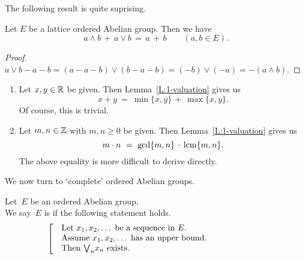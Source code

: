 \noindent
The following result is quite suprising.
%
%
\begin{lem}
\label{L:1-valuation}
Let $E$ be a lattice ordered Abelian group.
Then we have 
\begin{equation*}
a\wedge b  \,+\, a\vee b \,=\, a\,+\,b \qquad(a,b\in E).
\end{equation*}
\end{lem}
\begin{proof}
$a\vee b - a - b
= (a - a - b) \vee (b - a - b)
= (-b)\vee(-a) = -(a\wedge b)$.
\end{proof}
\begin{exs}
\begin{enumerate}
\item
Let $x,y\in \mathbb{R}$ be given.
Then Lemma~\ref{L:1-valuation}
gives us
\begin{equation*}
x+y\ =\ \min\{x,y\} \,+\, \max\{x,y\}.
\end{equation*}
Of course, this is trivial.

\item
Let $m,n\in \mathbb{Z}$ with $m,n\geq 0$ be given.
Then Lemma~\ref{L:1-valuation}
gives us
\begin{equation*}
m\cdot n \ =\ \gcd\{m,n\} \,\cdot\,\operatorname{lcm}\{m,n\}.
\end{equation*}
The above equality is more difficult to derive directly.
\end{enumerate}
\end{exs}
%
%
\noindent
We now turn to `complete' ordered Abelian groups.
\begin{dfn}
\label{D:sdc}
Let~$E$ be an ordered Abelian group.\\
We say~$E$ is 
if the following statement holds.
\begin{equation*}
\left[\quad
\begin{minipage}{.7\columnwidth}
Let $x_1,x_2,\dotsc$ be a sequence in~$E$.\\
Assume $x_1,x_2,\dotsc$ has an upper bound.\\
Then $\bv_n x_n$ exists.
\end{minipage}
\right.
\end{equation*}
\end{dfn}
%
%
